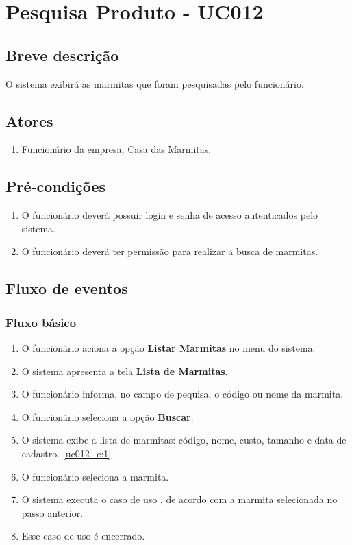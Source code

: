 \chapter{Pesquisa Produto - UC012} \label{uc012}

\section{Breve descrição}

O sistema exibirá as marmitas que foram pesquisadas pelo funcionário.

\section{Atores}

\begin{enumerate}
	\item Funcionário da empresa, Casa das Marmitas.
\end{enumerate}

\section{Pré-condições}

\begin{enumerate}
	\item O funcionário deverá possuir login e senha de acesso autenticados pelo sistema.
	\item O funcionário deverá ter permissão para realizar a busca de marmitas.
\end{enumerate}

\section{Fluxo de eventos}

\subsection{Fluxo básico}

\begin{enumerate}[label=P\arabic*]
	\item O funcionário aciona a opção \textbf{Listar Marmitas} no menu do sistema.
	\item O sistema apresenta a tela \textbf{Lista de Marmitas}. \label{uc012_p:2}	
	\item O funcionário informa, no campo de pequisa, o código ou nome da marmita.
	\item O funcionário seleciona a opção \textbf{Buscar}.
	\item O sistema exibe a lista de marmitas: código, nome, custo, tamanho e data de cadastro. \label{uc012_p:5}\ref{uc012_e:1}
	\item O funcionário seleciona a marmita.
	\item O sistema executa o caso de uso , de acordo com a marmita selecionada no passo anterior.
	\item Esse caso de uso é encerrado.
\end{enumerate}

